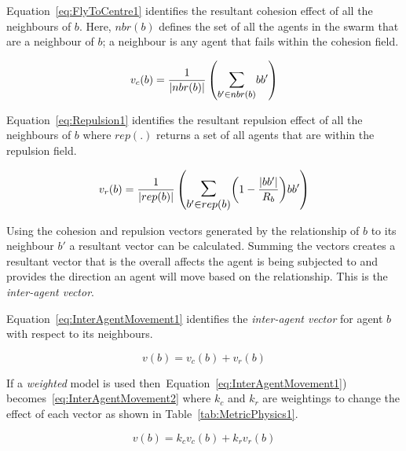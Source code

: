 \documentclass{ieeeaccess}
\begin{document}

Equation~\ref{eq:FlyToCentre1} identifies the resultant cohesion effect of all the neighbours of $b$. Here, $nbr(b)$ defines the set of all the agents in the swarm that are a neighbour of $b$; a neighbour is any agent that fails within the cohesion field.

\begin{equation}\label{eq:FlyToCentre1}
v_{c}(b) = \frac{1}{|nbr(b)|}\left({\mathlarger{\sum_{b' \in nbr(b)}}{bb'}}\right)
\end{equation}

Equation~\ref{eq:Repulsion1} identifies the resultant repulsion effect of all the neighbours of $b$ where $rep(.)$ returns a set of all agents that are within the repulsion field.

\begin{equation}
\label{eq:Repulsion1}
v_{r}(b) = 
\frac{1}{|rep(b)|}
\left(
\mathlarger{\mathlarger{\sum_{b' \in rep(b)}}}
{\left( 1-\frac{|bb'|}{R_b} \right)}
{bb'}
\right)
\end{equation}

Using the cohesion and repulsion vectors generated by the relationship of $b$ to its neighbour $b'$ a resultant vector can be calculated. Summing the vectors creates a resultant vector that is the overall affects the agent is being subjected to and provides the direction an agent will move based on the relationship. This is the \textit{inter-agent vector}.

Equation~\ref{eq:InterAgentMovement1} identifies the \textit{inter-agent vector} for agent $b$ with respect to its neighbours.

\begin{equation}\label{eq:InterAgentMovement1}
v(b) = v_{c}(b) + v_{r}(b)
\end{equation}

If a \textit{weighted} model is used then~Equation~\ref{eq:InterAgentMovement1}) becomes~\ref{eq:InterAgentMovement2} where $k_c$ and $k_r$ are weightings to change the effect of each vector as shown in Table~\ref{tab:MetricPhysics1}.

\begin{equation}\label{eq:InterAgentMovement2}
v(b) = k_cv_{c}(b) + k_rv_{r}(b)
\end{equation}
\end{document}
